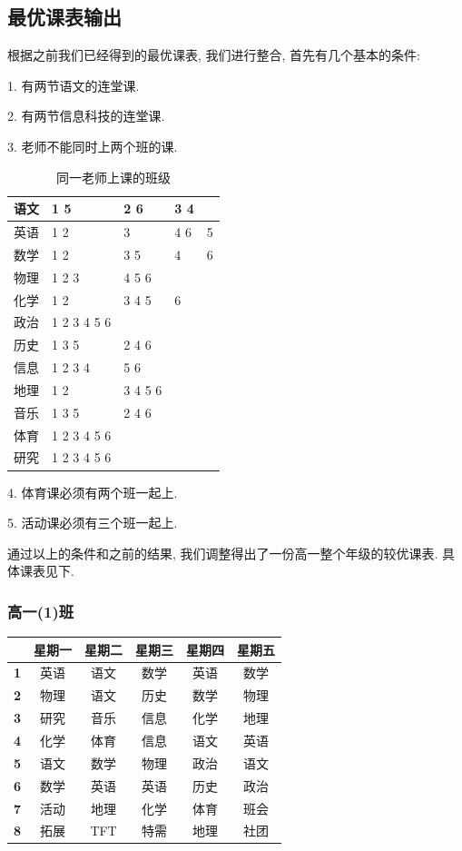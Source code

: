\documentclass[a4paper]{article}
\begin{document}
 \subsection{最优课表输出}
  根据之前我们已经得到的最优课表, 我们进行整合, 首先有几个基本的条件:\par
  1. 有两节语文的连堂课.\par
  2. 有两节信息科技的连堂课.\par
  3. 老师不能同时上两个班的课.\par
  \begin{table}[H]
  \centering
  \begin{tabular}{|l|p{50pt}p{50pt}p{50pt}p{50pt}|}
  \hline
  语文 & 1 5 & 2 6 & 3 4 & \\\hline
  英语 & 1 2 & 3 & 4 6 & 5 \\\hline
  数学 & 1 2 & 3 5 & 4 & 6 \\\hline
  物理 & 1 2 3 & 4 5 6 & & \\\hline
  化学 & 1 2 & 3 4 5 & 6 & \\\hline
  政治 & 1 2 3 4 5 6 & & & \\\hline
  历史 & 1 3 5 & 2 4 6 & & \\\hline
  信息 & 1 2 3 4 & 5 6 & & \\\hline
  地理 & 1 2 & 3 4 5 6 & & \\\hline
  音乐 & 1 3 5 & 2 4 6 & & \\\hline
  体育 & 1 2 3 4 5 6 & & & \\\hline
  研究 & 1 2 3 4 5 6 & & & \\\hline
  \end{tabular}
  \caption{同一老师上课的班级}
  \end{table}
  4. 体育课必须有两个班一起上.\par
  5. 活动课必须有三个班一起上.\par
  通过以上的条件和之前的结果, 我们调整得出了一份高一整个年级的较优课表. 具体课表见下.
  \subsubsection{高一(1)班}
   \begin{tabular}{|c|c|c|c|c|c|}
   \hline
   & \bf 星期一 & \bf 星期二 & \bf 星期三 & \bf 星期四 & \bf 星期五 \\\hline
   \bf 1 & 英语 & 语文 & 数学 & 英语 & 数学 \\\hline
   \bf 2 & 物理 & 语文 & 历史 & 数学 & 物理 \\\hline
   \bf 3 & 研究 & 音乐 & 信息 & 化学 & 地理 \\\hline
   \bf 4 & 化学 & 体育 & 信息 & 语文 & 英语 \\\hline
   \bf 5 & 语文 & 数学 & 物理 & 政治 & 语文 \\\hline
   \bf 6 & 数学 & 英语 & 英语 & 历史 & 政治 \\\hline
   \bf 7 & 活动 & 地理 & 化学 & 体育 & 班会 \\\hline
   \bf 8 & 拓展 & TFT  & 特需 & 地理 & 社团 \\\hline
   \end{tabular}
\end{document}
